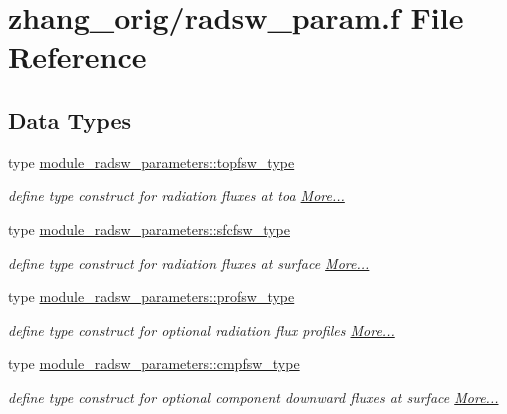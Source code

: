 \hypertarget{zhang__orig_2radsw__param_8f}{}\section{zhang\+\_\+orig/radsw\+\_\+param.f File Reference}
\label{zhang__orig_2radsw__param_8f}
\subsection*{Data Types}
\begin{DoxyCompactItemize}
\item 
type \hyperlink{namespacemodule__radsw__parameters_structmodule__radsw__parameters_1_1topfsw__type}{module\+\_\+radsw\+\_\+parameters\+::topfsw\+\_\+type}
\begin{DoxyCompactList}\small\item\em define type construct for radiation fluxes at toa  \hyperlink{namespacemodule__radsw__parameters_structmodule__radsw__parameters_1_1topfsw__type}{More...}\end{DoxyCompactList}\item 
type \hyperlink{group__module__radsw__main_structmodule__radsw__parameters_1_1sfcfsw__type}{module\+\_\+radsw\+\_\+parameters\+::sfcfsw\+\_\+type}
\begin{DoxyCompactList}\small\item\em define type construct for radiation fluxes at surface  \hyperlink{group__module__radsw__main_structmodule__radsw__parameters_1_1sfcfsw__type}{More...}\end{DoxyCompactList}\item 
type \hyperlink{group__module__radsw__main_structmodule__radsw__parameters_1_1profsw__type}{module\+\_\+radsw\+\_\+parameters\+::profsw\+\_\+type}
\begin{DoxyCompactList}\small\item\em define type construct for optional radiation flux profiles  \hyperlink{group__module__radsw__main_structmodule__radsw__parameters_1_1profsw__type}{More...}\end{DoxyCompactList}\item 
type \hyperlink{group__module__radsw__main_structmodule__radsw__parameters_1_1cmpfsw__type}{module\+\_\+radsw\+\_\+parameters\+::cmpfsw\+\_\+type}
\begin{DoxyCompactList}\small\item\em define type construct for optional component downward fluxes at surface  \hyperlink{group__module__radsw__main_structmodule__radsw__parameters_1_1cmpfsw__type}{More...}\end{DoxyCompactList}\end{DoxyCompactItemize}
